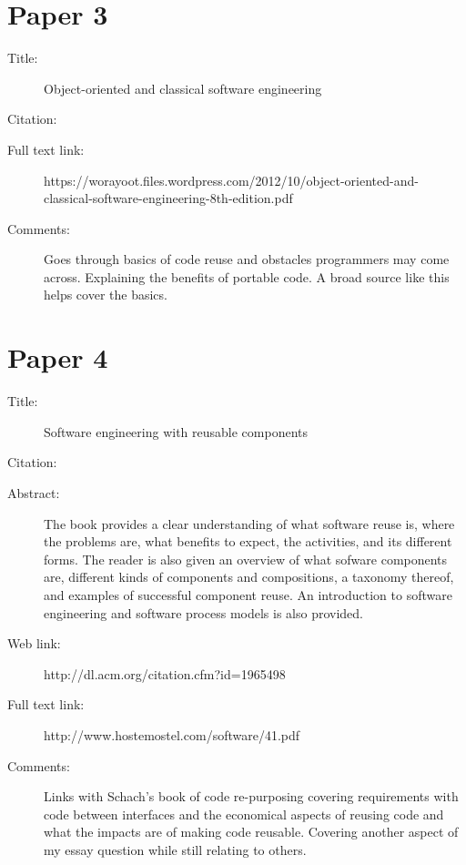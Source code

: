 \documentclass{scrartcl}
\begin{document}
\section*{Paper 3}
\begin{description}
\item[Title:] Object-oriented and classical software engineering
\item[Citation:] \cite{ReusableSchach}
\item[Full text link:] https://worayoot.files.wordpress.com/2012/10/object-oriented-and-classical-software-engineering-8th-edition.pdf
\item[Comments:] Goes through basics of code reuse and obstacles programmers may come across. 
Explaining the benefits of portable code.
A broad source like this helps cover the basics.
\end{description}

\section*{Paper 4}
\begin{description}
\item[Title:] Software engineering with reusable components
\item[Citation:] \cite{ReusableSametinger}
\item[Abstract:] The book provides a clear understanding of what software reuse is, where the problems are, what benefits to expect, the activities, and its different forms. The reader is also given an overview of what sofware components are, different kinds of components and compositions, a taxonomy thereof, and examples of successful component reuse. An introduction to software engineering and software process models is also provided.
\item[Web link:] http://dl.acm.org/citation.cfm?id=1965498
\item[Full text link:] http://www.hostemostel.com/software/41.pdf
\item[Comments:] 
Links with Schach's book of code re-purposing covering requirements with code between interfaces and the economical aspects of reusing code and what the impacts are of making code reusable. 
Covering another aspect of my essay question while still relating to others.
\end{description}
\end{document}
